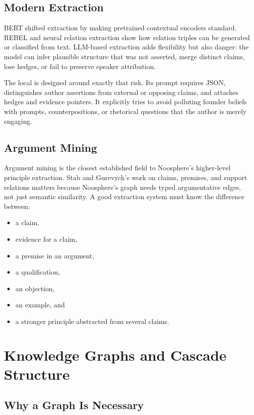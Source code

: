 \documentclass[11pt]{article}
\newcommand{\code}[1]{\texttt{\detokenize{#1}}}
\begin{document}
\subsection{Modern Extraction}

BERT shifted extraction by making pretrained contextual encoders standard.
REBEL and neural relation extraction show how relation triples can be generated
or classified from text. LLM-based extraction adds flexibility but also danger:
the model can infer plausible structure that was not asserted, merge distinct
claims, lose hedges, or fail to preserve speaker attribution.

The local \code{ClaimExtractor} is designed around exactly that risk. Its prompt
requires JSON, distinguishes author assertions from external or opposing claims,
and attaches hedges and evidence pointers. It explicitly tries to avoid
polluting founder beliefs with prompts, counterpositions, or rhetorical
questions that the author is merely engaging.

\subsection{Argument Mining}

Argument mining is the closest established field to Noosphere's higher-level
principle extraction. Stab and Gurevych's work on claims, premises, and support
relations matters because Noosphere's graph needs typed argumentative edges, not
just semantic similarity. A good extraction system must know the difference
between:

\begin{itemize}
\item a claim,
\item evidence for a claim,
\item a premise in an argument,
\item a qualification,
\item an objection,
\item an example, and
\item a stronger principle abstracted from several claims.
\end{itemize}

\section{Knowledge Graphs and Cascade Structure}

\subsection{Why a Graph Is Necessary}
\end{document}
